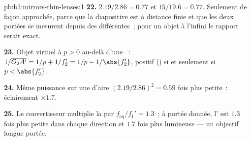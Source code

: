 \begin{solution}{pb:b1:mirrors-thin-lenses:1}
\textbf{22.} $2.19/2.86 = 0.77$ et $15/19.6 = 0.77$. Seulement de façon
approchée, parce que la diapositive est à distance finie et que les deux
portées se mesurent depuis des  différentes~; pour un objet à
l'infini le rapport serait exact.

\textbf{23.} Objet virtuel à $p > 0$ au-delà d'une ~:
$1/\overline{O_2A'} = 1/p + 1/f_2' = 1/p - 1/\abs{f_2'}$, positif () si et seulement si $p < \abs{f_2'}$.

\textbf{24.} Même puissance sur une  d'aire $(2.19/2.86)^2 = 0.59$
fois plus petite~: éclairement $\times 1.7$.

\textbf{25.} Le convertisseur multiplie la  par
$f_{\mathrm{eq}}/f_1' = 1.3$~; à portée donnée, l' est $1.3$ fois
plus petite dans chaque direction et $1.7$ fois plus lumineuse --- un
objectif longue portée.
\end{solution}
